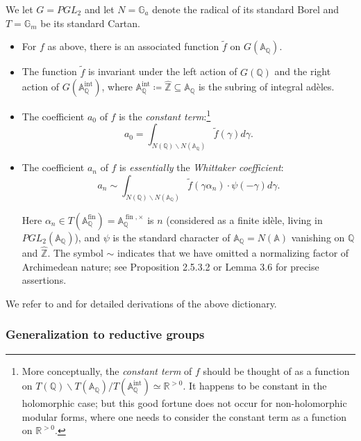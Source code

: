 \documentclass[reqno,11pt]{amsart}
\numberwithin{equation}{subsection}
\theoremstyle{remark}
\newcommand{\bA}{{\mathbb A}}
\newcommand{\bG}{{\mathbb G}}
\newcommand{\bQ}{{\mathbb Q}}
\newcommand{\bR}{{\mathbb R}}
\newcommand{\bZ}{{\mathbb Z}}
\newcommand{\on}{\operatorname}
\renewcommand{\subset}{\subseteq}
\begin{document}
We let $G = PGL_2$ and let $N = \bG_a$ denote the radical of its standard Borel
and $T = \bG_m$ be its standard Cartan.

\begin{itemize}

\item For $f$ as above, there is an associated function $\widetilde{f}$
on $G(\bA_{\bQ})$. 

\item The function $\widetilde{f}$ is invariant under the left action of 
$G(\bQ)$ and the right action of $G(\bA_{\bQ}^{\on{int}})$, where
$\bA_{\bQ}^{\on{int}} \coloneqq \widehat{\bZ} \subset \bA_{\bQ}$ is the
subring of integral ad\`eles.

\item The coefficient $a_0$ of $f$ is the \emph{constant term}:\footnote{More
conceptually, the \emph{constant term} of $f$ should be thought of as a function on 
$T(\bQ)\backslash T(\bA_{\bQ})/T(\bA_{\bQ}^{\on{int}}) \simeq \bR^{>0}$. It
happens to be constant in the holomorphic case; but this good fortune
does not occur for non-holomorphic modular forms, where one needs to consider
the constant term as a function on $\bR^{>0}$.}
%
\[
a_0 = \int_{N(\bQ)\backslash N(\bA_{\bQ})} \widetilde{f}(\gamma) d\gamma.
\]

\item The coefficient $a_n$ of $f$ is \emph{essentially} 
the \emph{Whittaker coefficient}:
%
\begin{equation}\label{eq:an}
a_n \sim \int_{N(\bQ)\backslash N(\bA_{\bQ})} \widetilde{f}(\gamma\alpha_n) \cdot 
\psi(-\gamma) d\gamma.
\end{equation}

\noindent 
Here $\alpha_n \in T(\bA_{\bQ}^{\on{fin}}) = \bA_{\bQ}^{\on{fin},\times}$
is $n$ (considered as a finite id\`ele, living in $PGL_2(\bA_{\bQ})$), 
and $\psi$ is the standard character of $\bA_{\bQ} = N(\bA)$ vanishing on $\bQ$
and $\widehat{\bZ}$. 
The symbol $\sim$ indicates that we have omitted a normalizing factor of
Archimedean nature;
see \cite{deligne-gl2} Proposition 2.5.3.2 or \cite{gelbart-automorphic}
Lemma 3.6 for precise assertions.

\end{itemize}

We refer to \cite{deligne-gl2} and \cite{gelbart-automorphic}  
for detailed derivations of the above dictionary.

\subsubsection{Generalization to reductive groups}
\end{document}
